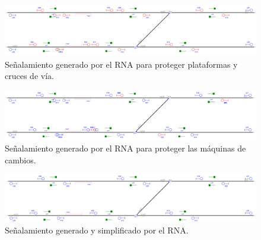     \begin{figure}[h]
        \centering
        \includegraphics[width=1\textwidth]{resultados-obtenidos/ejemplo8/images/8_step3.png}
        \centering\caption{Señalamiento generado por el RNA para proteger plataformas y cruces de vía.}
    \end{figure}

    \begin{figure}[h]
        \centering
        \includegraphics[width=1\textwidth]{resultados-obtenidos/ejemplo8/images/8_step4.png}
        \centering\caption{Señalamiento generado por el RNA para proteger las máquinas de cambios.}
    \end{figure}

    \begin{figure}[h]
        \centering
        \includegraphics[width=1\textwidth]{resultados-obtenidos/ejemplo8/images/8_RNA.png}
        \centering\caption{Señalamiento generado y simplificado por el RNA.}
    \end{figure}

    
    
    
    